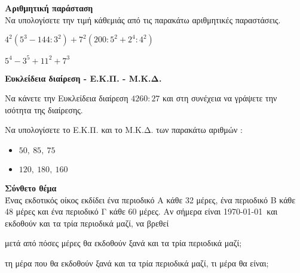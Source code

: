 \documentclass[ektypwsh]{diag-xelatex}
\begin{document}
\begin{thema}
\item \textbf{Αριθμητική παράσταση}\\
Να υπολογίσετε την τιμή κάθεμιάς από τις παρακάτω αριθμητικές παραστάσεις.
\begin{multicols}{2}
\begin{rlist}
\item $ 4^2(5^3-144:3^2)+7^2(200:5^2+2^4:4^2) $
\item $ 5^4-3^5+11^2+7^3 $
\end{rlist}
\end{multicols}
\item \textbf{Ευκλείδεια διαίρεση - Ε.Κ.Π. - Μ.Κ.Δ.}
\begin{rlist}
\item Να κάνετε την Ευκλείδεια διαίρεση $ 4260:27 $ και στη συνέχεια να γράψετε την ισότητα της διαίρεσης.
\item Να υπολογίσετε το Ε.Κ.Π. και το Μ.Κ.Δ. των παρακάτω αριθμών :
\begin{multicols}{2}
\begin{itemize}
\item $ 50,\ 85,\ 75 $
\item $ 120,\ 180,\ 160 $
\end{itemize}
\end{multicols}
\end{rlist}
\item \textbf{Σύνθετο θέμα}\\
Ένας εκδοτικός οίκος εκδίδει ένα περιοδικό Α κάθε 32 μέρες, ένα περιοδικό Β κάθε 48 μέρες και ένα περιοδικό Γ κάθε 60 μέρες. Αν σήμερα είναι \today\  και εκδοθούν και τα τρία περιοδικά μαζί, να βρεθεί
\begin{rlist}
\item μετά από πόσες μέρες θα εκδοθούν ξανά και τα τρία περιοδικά μαζί;
\item τη μέρα που θα εκδοθούν ξανά και τα τρία περιοδικά μαζί, τι μέρα θα είναι;
\end{rlist}
\end{thema}
\gymnasio
\kaliepityxia
\end{document}
